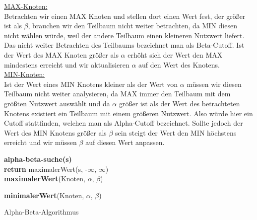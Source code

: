  \underline{MAX-Knoten:}\\
 Betrachten wir einen MAX Knoten und stellen dort einen Wert fest, der größer ist als $\beta$, brauchen wir den Teilbaum nicht weiter betrachten, da MIN diesen nicht wählen würde, weil der andere Teilbaum einen kleineren Nutzwert liefert. Das nicht weiter Betrachten des Teilbaums bezeichnet man als Beta-Cutoff. Ist  der Wert des MAX Knoten größer als $\alpha$ erhöht sich der Wert den MAX mindestens erreicht und wir aktualisieren $\alpha$ auf den Wert des Knotens.  \\

 \underline{MIN-Knoten:}\\
 Ist der Wert eines MIN Knotens kleiner als der Wert von $\alpha$ müssen wir diesen Teilbaum nicht weiter analysieren, da MAX immer den Teilbaum mit dem größten Nutzwert auswählt und da $\alpha$ größer ist als der Wert des betrachteten Knotens existiert ein Teilbaum mit einem größeren Nutzwert. Also würde hier ein Cutoff stattfinden, welchen man als Alpha-Cutoff bezeichnet. Sollte jedoch der Wert des MIN Knotens größer als $\beta$ sein steigt der Wert den MIN höchstens erreicht und wir müssen $\beta$ auf diesen Wert anpassen.


 \begin{algorithm}
 	\textbf{alpha-beta-suche(s)}\\

 	\textbf{return} maximalerWert(s, -$\infty$, $\infty$)\\

 	\textbf{maximalerWert}(Knoten, $\alpha$, $\beta$)\\


	\textbf{minimalerWert}(Knoten, $\alpha$, $\beta$)\\

 	\caption{Alpha-Beta-Algorithmus}
\end{algorithm}

